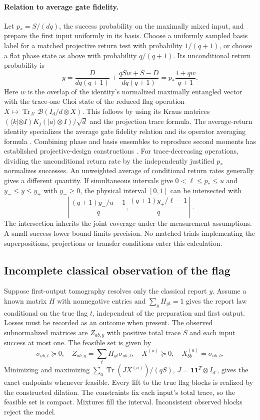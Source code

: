 \documentclass[11pt,letterpaper]{article}
\newcommand{\tr}{\operatorname{Tr}}\newcommand{\ket}[1]{\lvert#1\rangle}\newcommand{\proj}[1]{\ket{#1}\!\langle#1\rvert}
\begin{document}
\paragraph{Relation to average gate fidelity.}
Let $p_*=S/(dq)$, the success probability on the maximally mixed input, and prepare the first input uniformly in its basis. Choose a uniformly sampled basis label for a matched projective return test with probability $1/(q+1)$, or choose a flat phase state as above with probability $q/(q+1)$. Its unconditional return probability is
\[
 \bar y=\frac{D}{dq(q+1)}+
        \frac{qSw+S-D}{dq(q+1)}
       =p_*\frac{1+qw}{q+1}.
\]
Here $w$ is the overlap of the identity's normalized maximally entangled vector with the trace-one Choi state of the reduced flag operation $X\mapsto\operatorname{Tr}_{A'}\mathcal B(I_d/d\otimes X)$. This follows by using its Kraus matrices $(\langle k|\otimes I)K_j(|a\rangle\otimes I)/\sqrt d$ and the projection trace formula. The average-return identity specializes the average gate fidelity relation and its operator averaging formula \cite{nielsen,pedersen}. Combining phase and basis ensembles to reproduce second moments has established projective-design constructions \cite{iosue}. For trace-decreasing operations, dividing the unconditional return rate by the independently justified $p_*$ normalizes successes. An unweighted average of conditional return rates generally gives a different quantity. If simultaneous intervals give $0<\ell\le p_*\le u$ and $y_-\le\bar y\le y_+$ with $y_-\ge0$, the physical interval $[0,1]$ can be intersected with
\[
 \left[\frac{(q+1)y_-/u-1}{q},\frac{(q+1)y_+/\ell-1}{q}\right].
\]
The intersection inherits the joint coverage under the measurement assumptions. A small success lower bound limits precision. No matched trials implementing the superpositions, projections or transfer conditions enter this calculation.

\subsection{Incomplete classical observation of the flag}
Suppose first-output tomography resolves only the classical report $y$. Assume a known matrix $H$ with nonnegative entries and $\sum_y H_{yt}=1$ gives the report law conditional on the true flag $t$, independent of the preparation and first output. Losses must be recorded as an outcome when present. The observed subnormalized matrices are $Z_{ab,y}$ with positive total trace $S$ and each input success at most one. The feasible set is given by
\[
 \sigma_{ab,t}\succeq0,\quad Z_{ab,y}=\sum_tH_{yt}\sigma_{ab,t},
 \quad X^{(a)}\succeq0,\quad X^{(a)}_{bb}=\sigma_{ab,b}.
\]
Minimizing and maximizing $\sum_a\tr(J X^{(a)})/(qS)$, $J=\mathbf1\mathbf1^T\otimes I_{d'}$, gives the exact endpoints whenever feasible. Every lift to the true flag blocks is realized by the constructed dilation. The constraints fix each input's total trace, so the feasible set is compact. Mixtures fill the interval. Inconsistent observed blocks reject the model.
\end{document}
